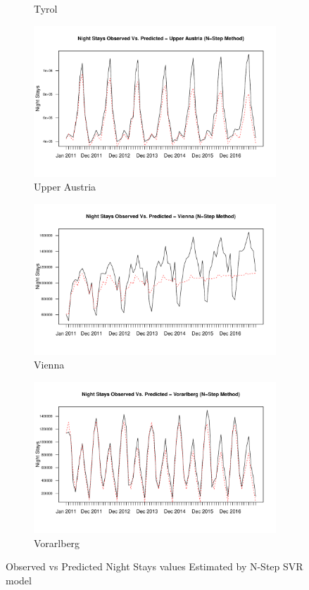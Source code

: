 \documentclass[a4paper,reqno,]{article}
\begin{document}
\begin{figure}[H]
\begin{subfigure}[b]{0.32\linewidth}
    \caption{Tyrol}
  \end{subfigure}
  \begin{subfigure}[b]{0.32\linewidth}
    \includegraphics[width=\linewidth]{images/SVR/UpperAustriaNstepSVR.pdf}
    \caption{Upper Austria}
  \end{subfigure}
  \begin{subfigure}[b]{0.32\linewidth}
    \includegraphics[width=\linewidth]{images/SVR/ViennaNstepSVR.pdf}
    \caption{Vienna}
  \end{subfigure}
  \begin{subfigure}[b]{0.32\linewidth}
    \includegraphics[width=\linewidth]{images/SVR/VorarlbergNstepSVR.pdf}
    \caption{Vorarlberg}
  \end{subfigure}
  \caption{Observed vs Predicted Night Stays values Estimated by N-Step SVR model}
  \label{fig:Time Series}
\end{figure}
\end{document}
